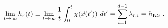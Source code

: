 \begin{equation}
\lim_{t\rightarrow \infty} h_r(t) \equiv
\lim_{t\rightarrow \infty} {1\over t} \int_0^t \chi(\vec x(t'))\ dt'
=\sum_{i=1}^{d-1}\lambda_{r,i} = h_\mathrm{KS}\ .
\label{eq24}
\end{equation}

